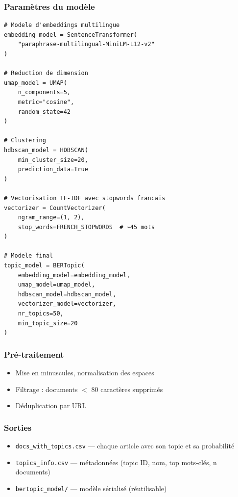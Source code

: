 \documentclass[11pt,a4paper]{report}
\newcommand{\code}[1]{\texttt{\small #1}}
\begin{document}
\subsubsection{Paramètres du modèle}

\begin{lstlisting}[language=Python3, caption={Initialisation de BERTopic (bertopic\_train\_save.py)}]
# Modele d'embeddings multilingue
embedding_model = SentenceTransformer(
    "paraphrase-multilingual-MiniLM-L12-v2"
)

# Reduction de dimension
umap_model = UMAP(
    n_components=5,
    metric="cosine",
    random_state=42
)

# Clustering
hdbscan_model = HDBSCAN(
    min_cluster_size=20,
    prediction_data=True
)

# Vectorisation TF-IDF avec stopwords francais
vectorizer = CountVectorizer(
    ngram_range=(1, 2),
    stop_words=FRENCH_STOPWORDS  # ~45 mots
)

# Modele final
topic_model = BERTopic(
    embedding_model=embedding_model,
    umap_model=umap_model,
    hdbscan_model=hdbscan_model,
    vectorizer_model=vectorizer,
    nr_topics=50,
    min_topic_size=20
)
\end{lstlisting}

\subsubsection{Pré-traitement}

\begin{itemize}
  \item Mise en minuscules, normalisation des espaces
  \item Filtrage : documents $<$ 80 caractères supprimés
  \item Déduplication par URL
\end{itemize}

\subsubsection{Sorties}

\begin{itemize}
  \item \code{docs\_with\_topics.csv} — chaque article avec son topic et sa probabilité
  \item \code{topics\_info.csv} — métadonnées (topic ID, nom, top mots-clés, n documents)
  \item \code{bertopic\_model/} — modèle sérialisé (réutilisable)
\end{itemize}
\end{document}
